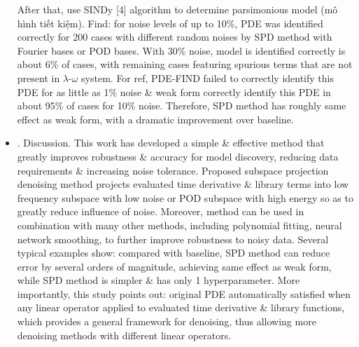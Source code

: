 \documentclass{article}
\begin{document}
\begin{itemize}
	After that, use SINDy [4] algorithm to determine parsimonious model (mô hình tiết kiệm). Find: for noise levels of up to 10\%, PDE was identified correctly for 200 cases with different random noises by SPD method with Fourier bases or POD bases. With 30\% noise, model is identified correctly is about 6\% of cases, with remaining cases featuring spurious terms that are not present in $\lambda$-$\omega$ system. For ref, PDE-FIND failed to correctly identify this PDE for as little as 1\% noise \& weak form correctly identify this PDE in about 95\% of cases for 10\% noise. Therefore, SPD method has roughly same effect as weak form, with a dramatic improvement over baseline.
	\item {. Discussion.} This work has developed a simple \& effective method that greatly improves robustness \& accuracy for model discovery, reducing data requirements \& increasing noise tolerance. Proposed subspace projection denoising method projects evaluated time derivative \& library terms into low frequency subspace with low noise or POD subspace with high energy so as to greatly reduce influence of noise. Moreover, method can be used in combination with many other methods, including polynomial fitting, neural network smoothing, to further improve robustness to noisy data. Several typical examples show: compared with baseline, SPD method can reduce error by several orders of magnitude, achieving same effect as weak form, while SPD method is simpler \& has only 1 hyperparameter. More importantly, this study points out: original PDE automatically satisfied when any linear operator applied to evaluated time derivative \& library functions, which provides a general framework for denoising, thus allowing more denoising methods with different linear operators.
\end{itemize}
\end{document}
